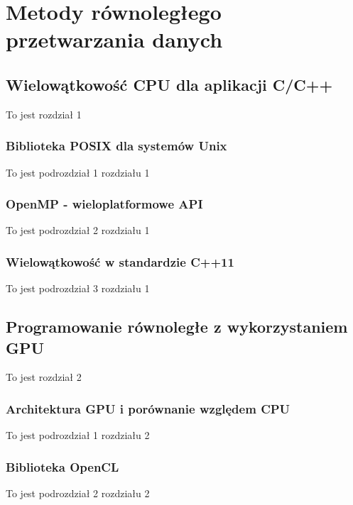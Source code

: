 \documentclass[document.tex]{subfiles}
\begin{document}
\chapter{Metody równoległego przetwarzania danych}
\section{Wielowątkowość CPU dla aplikacji C/C++}
To jest rozdział 1
	\subsection{Biblioteka POSIX dla systemów Unix}
	To jest podrozdział 1 rozdziału 1
	\subsection{OpenMP - wieloplatformowe API}
	To jest podrozdział 2 rozdziału 1
	\subsection{Wielowątkowość w standardzie C++11}
	To jest podrozdział 3 rozdziału 1
\section{Programowanie równoległe z wykorzystaniem GPU}
	To jest rozdział 2
	\subsection{Architektura GPU i porównanie względem CPU}
	To jest podrozdział 1 rozdziału 2
	\subsection{Biblioteka OpenCL}
	To jest podrozdział 2 rozdziału 2
\end{document}
